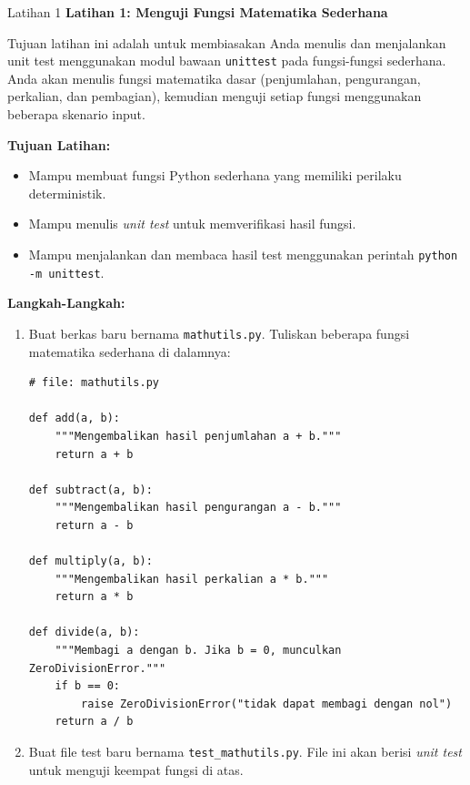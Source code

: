 \documentclass[aspectratio=169, table]{beamer}
\begin{document}
\begin{frame}[fragile,allowframebreaks=0.8]{Latihan 1}
\footnotesize
\textbf{Latihan 1: Menguji Fungsi Matematika Sederhana}\par\medskip
Tujuan latihan ini adalah untuk membiasakan Anda menulis dan menjalankan unit test menggunakan modul bawaan \texttt{unittest} pada fungsi-fungsi sederhana.  
Anda akan menulis fungsi matematika dasar (penjumlahan, pengurangan, perkalian, dan pembagian), kemudian menguji setiap fungsi menggunakan beberapa skenario input.

\medskip\textbf{Tujuan Latihan:}\par 
\begin{itemize}
    \item Mampu membuat fungsi Python sederhana yang memiliki perilaku deterministik.
    \item Mampu menulis \textit{unit test} untuk memverifikasi hasil fungsi.
    \item Mampu menjalankan dan membaca hasil test menggunakan perintah \texttt{python -m unittest}.
\end{itemize}

\medskip\textbf{Langkah-Langkah:}\par 
\begin{enumerate}
    \item Buat berkas baru bernama \texttt{mathutils.py}.  
    Tuliskan beberapa fungsi matematika sederhana di dalamnya:

\begin{lstlisting}[style=PythonStyle, breaklines=true]
# file: mathutils.py

def add(a, b):
    """Mengembalikan hasil penjumlahan a + b."""
    return a + b

def subtract(a, b):
    """Mengembalikan hasil pengurangan a - b."""
    return a - b

def multiply(a, b):
    """Mengembalikan hasil perkalian a * b."""
    return a * b

def divide(a, b):
    """Membagi a dengan b. Jika b = 0, munculkan ZeroDivisionError."""
    if b == 0:
        raise ZeroDivisionError("tidak dapat membagi dengan nol")
    return a / b
\end{lstlisting}

    \item Buat file test baru bernama \texttt{test\_mathutils.py}.  
    File ini akan berisi \textit{unit test} untuk menguji keempat fungsi di atas.
\end{enumerate}


\end{frame}
\end{document}
